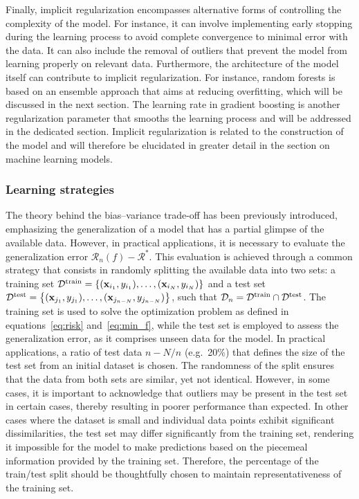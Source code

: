 \documentclass[main]{subfiles}
\begin{document}
Finally, implicit regularization encompasses alternative forms of controlling the complexity of the model. For instance, it can involve implementing early stopping during the learning process to avoid complete convergence to minimal error with the data. It can also include the removal of outliers that prevent the model from learning properly on relevant data. Furthermore, the architecture of the model itself can contribute to implicit regularization. For instance, random forests is based on an ensemble approach that aims at reducing overfitting, which will be discussed in the next section. The learning rate in gradient boosting is another regularization parameter that smooths the learning process and will be addressed in the dedicated section. Implicit regularization is related to the construction of the model and will therefore be elucidated in greater detail in the section on machine learning models.

\subsubsection{Learning strategies}

The theory behind the bias--variance trade-off has been previously introduced, emphasizing the generalization of a model that has a partial glimpse of the available data. However, in practical applications, it is necessary to evaluate the generalization error $\mathcal{R}_n(f)-\mathcal{R}^*$. This evaluation is achieved through a common strategy that consists in randomly splitting the available data into two sets: a training set $\mathcal{D}^{\text{train}}=\left\{{(\mathbf{x}_{i_1},y_{i_1}),\ldots,(\mathbf{x}_{i_N},y_{i_N})}\right\}$ and a test set $\mathcal{D}^{\text{test}}=\left\{(\mathbf{x}_{j_1},y_{j_1}),\ldots,(\mathbf{x}_{j_{n-N}},y_{j_{n-N}})\right\}$, such that $\mathcal{D}_n = \mathcal{D}^{\text{train}} \cap \mathcal{D}^{\text{test}}$. The training set is used to solve the optimization problem as defined in equations~\ref{eq:risk} and~\ref{eq:min_f}, while the test set is employed to assess the generalization error, as it comprises unseen data for the model. In practical applications, a ratio of test data $n-N/n$ (e.g.\ {20\%}) that defines the size of the test set from an initial dataset is chosen. The randomness of the split ensures that the data from both sets are similar, yet not identical. However, in some cases, it is important to acknowledge that outliers may be present in the test set in certain cases, thereby resulting in poorer performance than expected. In other cases where the dataset is small and individual data points exhibit significant dissimilarities, the test set may differ significantly from the training set, rendering it impossible for the model to make predictions based on the piecemeal information provided by the training set. Therefore, the percentage of the train/test split should be thoughtfully chosen to maintain representativeness of the training set.
\end{document}
